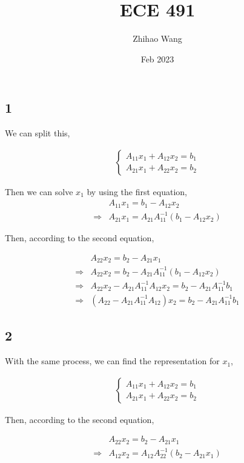 \documentclass{article}
\title{ECE 491}
\author{Zhihao Wang}
\date{Feb 2023}
\def\implies{\Longrightarrow}
\begin{document}
\maketitle

\subsection*{1}

We can split this, 

\[
\begin{split}
\begin{cases}
A_{11}x_1 + A_{12}x_2 = b_1 \\
A_{21}x_1 + A_{22}x_2 = b_2 
\end{cases}
\end{split}
\]


Then we can solve $x_1$ by using the first equation,
\[
\begin{split}
 & A_{11}x_1 = b_1 - A_{12}x_2 \\
 \implies & A_{21}x_1 = A_{21}A_{11}^{-1}(b_1 - A_{12}x_2)
\end{split}
\]

Then, according to the second equation,

\[
\begin{split}
 & A_{22}x_2 = b_2 - A_{21}x_1 \\
 \implies & A_{22}x_2 = b_2 - A_{21}A_{11}^{-1}(b_1 - A_{12}x_2) \\
 \implies & A_{22}x_2 - A_{21}A_{11}^{-1}A_{12}x_2 = b_2 -  A_{21}A_{11}^{-1}b_1 \\
 \implies & (A_{22} - A_{21}A_{11}^{-1}A_{12})x_2 = b_2 -  A_{21}A_{11}^{-1}b_1 
\end{split}
\]

\subsection*{2}

With the same process, we can find the representation for $x_1$,

\[
\begin{split}
\begin{cases}
A_{11}x_1 + A_{12}x_2 = b_1 \\
A_{21}x_1 + A_{22}x_2 = b_2 
\end{cases}
\end{split}
\]

Then, according to the second equation,

\[
\begin{split}
 & A_{22}x_2 = b_2 -  A_{21}x_1\\
 \implies & A_{12}x_2 = A_{12}A_{22}^{-1}(b_2 - A_{21}x_1)
\end{split}
\]
\end{document}
